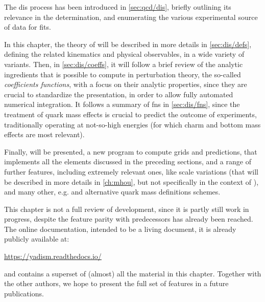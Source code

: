 
The \acrfull{dis} process has been introduced in \cref{sec:qcd/dis}, briefly
outlining its relevance in the \pdf determination, and enumerating the various
experimental source of \dis data for \pdf fits.

In this chapter, the theory of \dis will be described in more details in
\cref{sec:dis/defs}, defining the related kinematics and physical observables,
in a wide variety of variants.
Then, in \cref{sec:dis/coeffs}, it will follow a brief review of the analytic
ingredients that is possible to compute in perturbation theory, the so-called
\textit{coefficients functions}, with a focus on their analytic properties,
since they are crucial to standardize the presentation, in order to allow fully
automated numerical integration.
It follows a summary of \acrlong{fns} in \cref{sec:dis/fns}, since the
treatment of quark mass effects is crucial to predict the outcome of \dis
experiments, traditionally operating at not-so-high energies (for which charm
and bottom mass effects are most relevant).

Finally, \yadism will be presented, a new program to compute \dis grids and
predictions, that implements all the elements discussed in the preceding
sections, and a range of further features, including extremely relevant ones,
like scale variations (that will be described in more details in
\cref{ch:mhou}, but not specifically in the context of \dis), and many other,
e.g. \tmc and alternative quark mass definitions schemes.

This chapter is not a full review of \yadism development, since it is partly
still work in progress, despite the feature parity with predecessors has
already been reached.
%
The online documentation, intended to be a living document, it is already
publicly available at:
\begin{center}
  \url{https://yadism.readthedocs.io/}
\end{center}
and contains a superset of (almost) all the material in this chapter.
%
Together with the other authors, we hope to present the full set of features in
a future publications.
